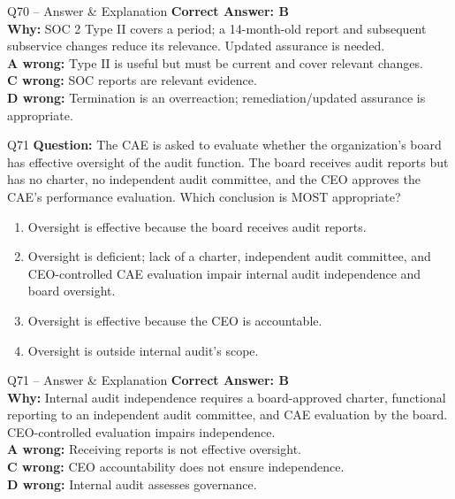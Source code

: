 \documentclass[aspectratio=169,10pt]{beamer}
\begin{document}
	\begin{frame}[t]{Q70 -- Answer \& Explanation}
		\small
		\textbf{Correct Answer: B} \\[4pt]
		\textbf{Why:} SOC 2 Type II covers a period; a 14-month-old report and subsequent subservice changes reduce its relevance. Updated assurance is needed. \\[4pt]
		\textbf{A wrong:} Type II is useful but must be current and cover relevant changes. \\[2pt]
		\textbf{C wrong:} SOC reports are relevant evidence. \\[2pt]
		\textbf{D wrong:} Termination is an overreaction; remediation/updated assurance is appropriate.
	\end{frame}
	
	\begin{frame}[t]{Q71}
		\small
		\textbf{Question:} The CAE is asked to evaluate whether the organization's board has effective oversight of the audit function. The board receives audit reports but has no charter, no independent audit committee, and the CEO approves the CAE's performance evaluation. Which conclusion is MOST appropriate?
		\begin{enumerate}[label=\Alph*.,itemsep=1pt,topsep=2pt]
			\item Oversight is effective because the board receives audit reports.
			\item Oversight is deficient; lack of a charter, independent audit committee, and CEO-controlled CAE evaluation impair internal audit independence and board oversight.
			\item Oversight is effective because the CEO is accountable.
			\item Oversight is outside internal audit's scope.
		\end{enumerate}
	\end{frame}
	
	\begin{frame}[t]{Q71 -- Answer \& Explanation}
		\small
		\textbf{Correct Answer: B} \\[4pt]
		\textbf{Why:} Internal audit independence requires a board-approved charter, functional reporting to an independent audit committee, and CAE evaluation by the board. CEO-controlled evaluation impairs independence. \\[4pt]
		\textbf{A wrong:} Receiving reports is not effective oversight. \\[2pt]
		\textbf{C wrong:} CEO accountability does not ensure independence. \\[2pt]
		\textbf{D wrong:} Internal audit assesses governance.
	\end{frame}
	
\end{document}
